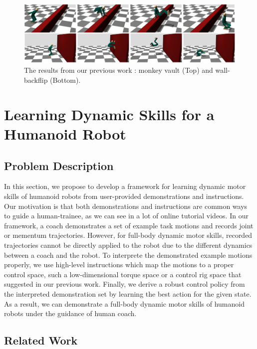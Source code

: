 \begin{figure}[htbp]
\center
  \includegraphics[width=\linewidth]{images/training1_teaser}
  \caption{The results from our previous work
    \cite{Ha:2014:ITD}:
    monkey vault (Top) and wall-backflip (Bottom).}
 \label{fig:training1_teaser}
\end{figure}


\section{Learning Dynamic Skills for a Humanoid Robot}

\subsection{Problem Description}

In this section, we propose to develop a framework for learning
dynamic motor skills of humanoid robots from user-provided demonstrations 
and instructions.
Our motivation is that both demonstrations and instructions are
common ways to guide a human-trainee, as we can see in a lot of
online tutorial videos.
In our framework, a coach demonstrates a set of example task motions
and records joint or mementum trajectories.
However, for full-body dynamic motor skills, recorded trajectories cannot 
be directly applied to the robot due to the different dynamics 
between a coach and the robot.
To interprete the demonstrated example motions properly,
we use high-level instructions which map the motions
to a proper control space, such a low-dimensional torque space 
or a control rig space \cite{Ha:2014:ITD} 
that suggested in our previous work.
Finally, we derive a robust control policy from the interpreted
demonstration set by learning the best action for the given state.
As a result, we can demonstrate a full-body dynamic motor skills
of humanoid robots under the guidance of human coach.

\subsection{Related Work}

